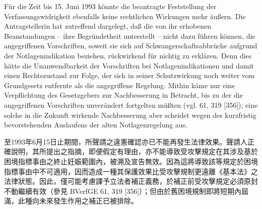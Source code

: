 \documentclass[12pt]{article}
\begin{document}
\begin{sourcepara}[title={原文E.261}]
Für die Zeit bis 15. Juni 1993 könnte die beantragte Feststellung der Verfassungswidrigkeit ebenfalls keine rechtlichen Wirkungen mehr äußern. Die Antragstellerin hat zutreffend dargelegt, daß die von ihr erhobenen Beanstandungen -- ihre Begründetheit unterstellt -- nicht dazu führen können, die angegriffenen Vorschriften, soweit sie sich auf Schwangerschaftsabbrüche aufgrund der Notlagenindikation beziehen, rückwirkend für nichtig zu erklären. Denn dies hätte die Unanwendbarkeit der Vorschriften bei Notlagenindikationen und damit einen Rechtszustand zur Folge, der sich in seiner Schutzwirkung noch weiter vom Grundgesetz entfernte als die angegriffene Regelung. Mithin käme nur eine Verpflichtung des Gesetzgebers zur Nachbesserung in Betracht, bis zu der die angegriffenen Vorschriften unverändert fortgelten müßten (vgl. \abbrBVerfGE{} 61, 319 [356]); eine solche in die Zukunft wirkende Nachbesserung aber scheidet wegen des kurzfristig bevorstehenden Auslaufens der alten Notlagenregelung aus.
\end{sourcepara}
\begin{transpara}
至1993年6月15日止期間，所聲請之違憲確認亦已不能再發生法律效果。聲請人正確說明，其所提出之指摘，即便假定有理由，亦不能導致受攻擊規定在其涉及基於困境指標事由之終止妊娠範圍內，被溯及宣告無效。因為這將導致該等規定於困境指標事由中不可適用，因而造成一種其保護效果比受攻擊規制更遠離《基本法》之法律狀態。因此，僅可能考慮課予立法者補正義務，於補正前受攻擊規定必須原封不動繼續有效（參見 BVerfGE 61, 319 [356]）；但由於舊困境規制即將短期內屆滿，此種向未來發生作用之補正已被排除。
\end{transpara}
\end{document}
